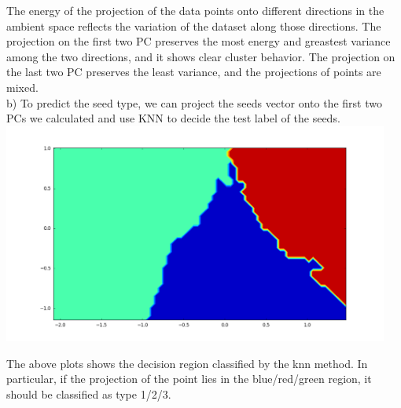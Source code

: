 \documentclass[11pt]{article}
\begin{document}
The energy of the projection of the data points onto different
directions in the ambient space reflects the variation of the dataset along those directions. The projection on the first two PC preserves the most energy and greastest variance among the two directions, and it shows clear cluster behavior. The projection on the last two PC preserves the least variance, and the projections of points are mixed. \\

b) 
To predict the seed type, we can project the seeds vector onto the first two PCs we calculated and use KNN to decide the test label of the seeds.\\
\includegraphics[width = 5in]{knn}

The above plots shows the decision region classified by the knn method. In particular, if the projection of the point lies in the blue/red/green region, it should be classified as type 1/2/3.
\end{document}

